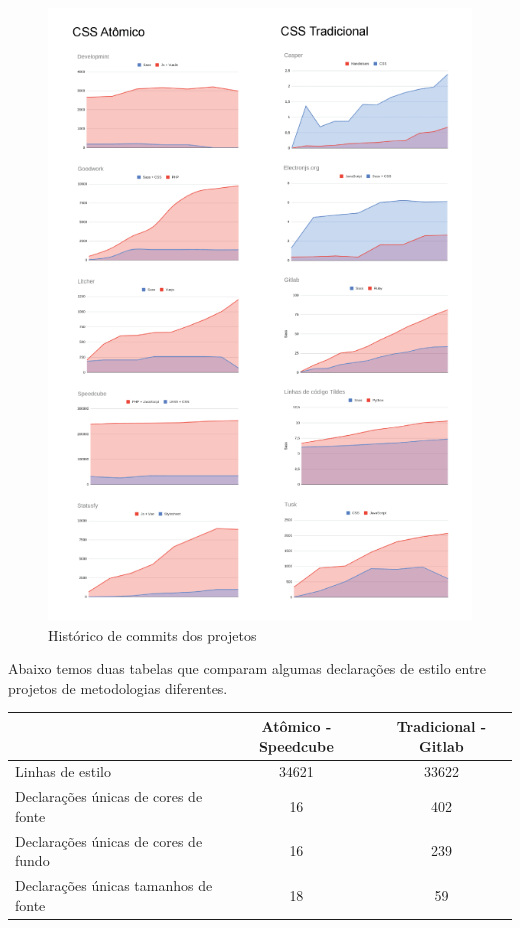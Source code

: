 \begin{figure}[H]
\centering
\includegraphics{figuras/juntoss.png}
\caption{Histórico de commits dos projetos}
\end{figure}

Abaixo temos duas tabelas que comparam algumas declarações de estilo entre projetos de metodologias diferentes.

\begin{table}[H]
\begin{tabular}{|l|c|c|}
\hline
                                     & \textbf{Atômico - Speedcube} & \textbf{Tradicional - Gitlab} \\ \hline
Linhas de estilo                     & 34621                        & 33622                         \\ \hline
Declarações únicas de cores de fonte & 16                           & 402                           \\ \hline
Declarações únicas de cores de fundo & 16                           & 239                           \\ \hline
Declarações únicas tamanhos de fonte & 18                           & 59                            \\ \hline
\end{tabular}
\end{table}

